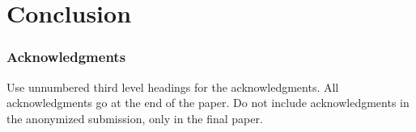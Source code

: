 \documentclass{article}
\begin{document}
\section{Conclusion}

\subsubsection*{Acknowledgments}
Use unnumbered third level headings for the acknowledgments. All
acknowledgments go at the end of the paper. Do not include
acknowledgments in the anonymized submission, only in the final paper.




\end{document}
